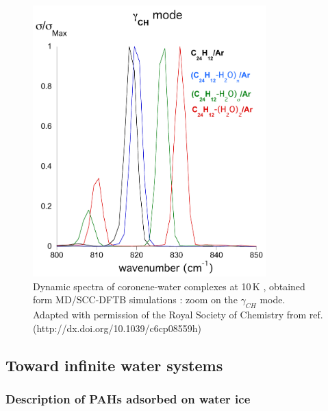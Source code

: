 \documentclass[]{interact}
\theoremstyle{plain}%
\theoremstyle{definition}
\theoremstyle{remark}
\begin{document}
  \begin{figure}[!ht]
   \begin{center}
\includegraphics[width=9cm]{comp_gCH.png}
\end{center}
\caption{Dynamic spectra of coronene-water complexes at 10\,K , obtained form MD/SCC-DFTB simulations : zoom on the $\gamma_{CH}$  mode. Adapted with permission of the Royal Society of Chemistry from ref. \cite{WaterCorMat_PCCP17}  (http://dx.doi.org/10.1039/c6cp08559h) }
\label{fig:irmat}
\end{figure}

\subsection{Toward infinite water systems } \label{infinite}

\subsubsection{Description of PAHs adsorbed on water ice } 
\end{document}
